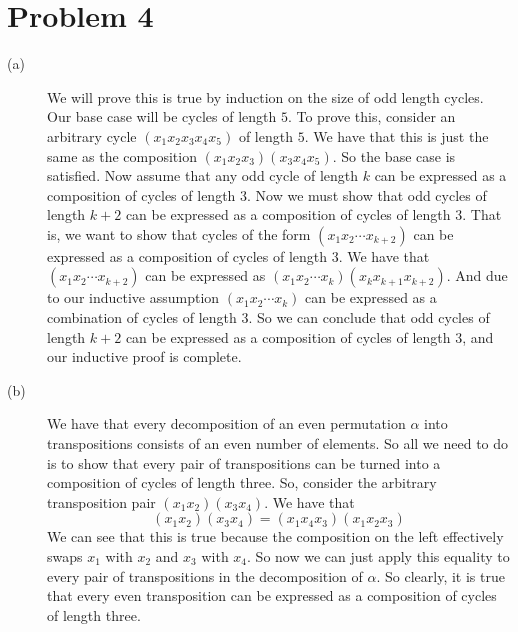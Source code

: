 \documentclass{article}
\begin{document}
\section*{Problem 4}
\begin{description}
    \item[(a)] We will prove this is true by induction on the size of odd
        length cycles. Our base case will be cycles of length $5$. To
        prove this, consider an arbitrary cycle $(x_1x_2x_3x_4x_5)$ of
        length $5$. We have that this is just the same as the composition
        $(x_1x_2x_3)(x_3x_4x_5)$. So the base case is satisfied. Now assume
        that any odd cycle of length $k$ can be expressed as a composition of
        cycles of length $3$. Now we must show that odd cycles of length
        $k+2$ can be expressed as a composition of cycles of length $3$.
        That is, we want to show that cycles of the form $(x_1x_2\cdots x_{k+2})$
        can be expressed as a composition of cycles of length $3$. We have that
        $(x_1x_2\cdots x_{k+2})$ can be expressed as
        $(x_1x_2\cdots x_k)(x_kx_{k+1}x_{k+2})$. And due to our inductive
        assumption $(x_1x_2\cdots x_k)$ can be expressed as a combination of
        cycles of length $3$. So we can conclude that odd cycles of length
        $k+2$ can be expressed as a composition of cycles of length $3$, and
        our inductive proof is complete.
    \item[(b)]
        We have that every decomposition of an even permutation $\alpha$ into
        transpositions consists of an even number of elements. So all we need
        to do is to show that every pair of transpositions can be turned into
        a composition of cycles of length three. So, consider the arbitrary
        transposition pair $(x_1x_2)(x_3x_4)$. We have that
        \[ (x_1x_2)(x_3x_4) = (x_1x_4x_3)(x_1x_2x_3) \]
        We can see that this is true because the composition on the left
        effectively swaps $x_1$ with $x_2$ and $x_3$ with $x_4$. So now
        we can just apply this equality to every pair of transpositions in
        the decomposition of $\alpha$. So clearly, it is true that every even
        transposition can be expressed as a composition of cycles of length
        three.
\end{description}

\end{document}
